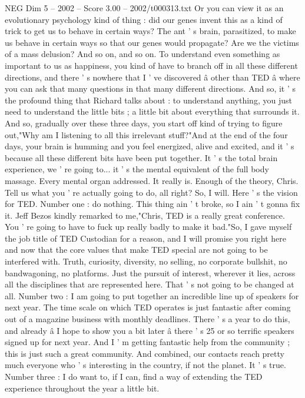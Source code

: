 \begin{textsample}{NEG Dim 5 – 2002 – Score 3.00 – 2002/t000313.txt}
Or you can view it as an evolutionary psychology kind of thing : did our genes invent this as a kind of trick to get us to behave in certain ways?
The ant ' s brain, parasitized, to make us behave in certain ways so that our genes would propagate?
Are we the victims of a mass delusion?
And so on, and so on.
To understand even something as important to us as happiness, you kind of have to branch off in all these different directions, and there ' s nowhere that I ' ve discovered â other than TED â where you can ask that many questions in that many different directions.
And so, it ' s the profound thing that Richard talks about : to understand anything, you just need to understand the little bits ; a little bit about everything that surrounds it.
And so, gradually over these three days, you start off kind of trying to figure out,"Why am I listening to all this irrelevant stuff?"And at the end of the four days, your brain is humming and you feel energized, alive and excited, and it ' s because all these different bits have been put together.
It ' s the total brain experience, we ' re going to... it ' s the mental equivalent of the full body massage.
Every mental organ addressed.
It really is.
Enough of the theory, Chris.
Tell us what you ' re actually going to do, all right?
So, I will.
Here ' s the vision for TED.
Number one : do nothing.
This thing ain ' t broke, so I ain ' t gonna fix it.
Jeff Bezos kindly remarked to me,"Chris, TED is a really great conference.
You ' re going to have to fuck up really badly to make it bad."So, I gave myself the job title of TED Custodian for a reason, and I will promise you right here and now that the core values that make TED special are not going to be interfered with.
Truth, curiosity, diversity, no selling, no corporate bullshit, no bandwagoning, no platforms.
Just the pursuit of interest, wherever it lies, across all the disciplines that are represented here.
That ' s not going to be changed at all.
Number two : I am going to put together an incredible line up of speakers for next year.
The time scale on which TED operates is just fantastic after coming out of a magazine business with monthly deadlines.
There ' s a year to do this, and already â I hope to show you a bit later â there ' s 25 or so terrific speakers signed up for next year.
And I ' m getting fantastic help from the community ; this is just such a great community.
And combined, our contacts reach pretty much everyone who ' s interesting in the country, if not the planet.
It ' s true.
Number three : I do want to, if I can, find a way of extending the TED experience throughout the year a little bit.

\end{textsample}
